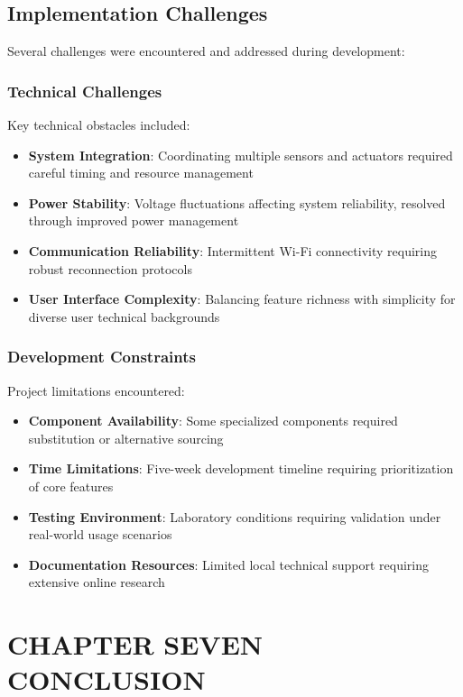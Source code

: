 \documentclass[12pt,a4paper]{report}
\begin{document}
\section{Implementation Challenges}

\noindent Several challenges were encountered and addressed during development:

\subsection{Technical Challenges}
\noindent Key technical obstacles included:
\begin{itemize}
\item \textbf{System Integration}: Coordinating multiple sensors and actuators required careful timing and resource management
\item \textbf{Power Stability}: Voltage fluctuations affecting system reliability, resolved through improved power management
\item \textbf{Communication Reliability}: Intermittent Wi-Fi connectivity requiring robust reconnection protocols
\item \textbf{User Interface Complexity}: Balancing feature richness with simplicity for diverse user technical backgrounds
\end{itemize}

\subsection{Development Constraints}
\noindent Project limitations encountered:
\begin{itemize}
\item \textbf{Component Availability}: Some specialized components required substitution or alternative sourcing
\item \textbf{Time Limitations}: Five-week development timeline requiring prioritization of core features
\item \textbf{Testing Environment}: Laboratory conditions requiring validation under real-world usage scenarios
\item \textbf{Documentation Resources}: Limited local technical support requiring extensive online research
\end{itemize}

\chapter[CHAPTER SEVEN CONCLUSION]{CHAPTER SEVEN\\CONCLUSION}
\end{document}
